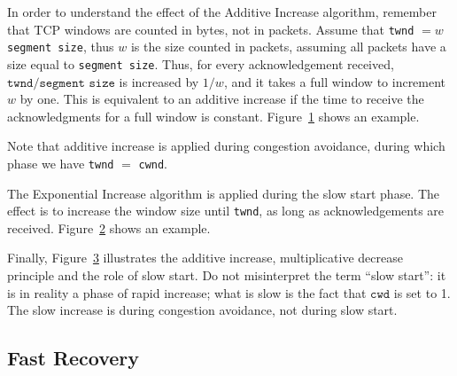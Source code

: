 %
In order to understand the effect of the Additive Increase algorithm,
remember that TCP windows are counted in bytes, not in packets.
Assume that \texttt{twnd} $= w$ \texttt{segment size}, thus $w$ is the
size counted in packets, assuming all packets have a size equal to
\texttt{segment size}. Thus, for every
acknowledgement received, $\texttt{twnd} / \texttt{segment size}$
is increased by $1/w$, and it takes a full window to increment $w$ by
one. This is equivalent to an additive increase if the time to
receive the acknowledgments for a full window is constant.
Figure~\ref{d32f3} shows an example.

Note that additive increase is applied during congestion avoidance,
during which phase we have \texttt{twnd} $=$ \texttt{cwnd}.
\begin{figure}[h]
        \protect\label{d32f3}
\end{figure}


The Exponential Increase algorithm is applied during the slow start
phase.  The effect is to increase the window size until \texttt{twnd},
as long as acknowledgements are received.  Figure~\ref{d32f4} shows an
example.

\begin{figure}[h]
        \protect\label{d32f4}
\end{figure}

Finally, Figure~\ref{d32f7} illustrates the additive increase,
multiplicative decrease principle and the role of slow start. Do not
misinterpret the term ``slow start'': it is in reality a phase of
rapid increase; what is slow is the fact that $\texttt{cwd}$ is set
to 1.  The slow increase is during congestion avoidance, not during
slow start.

\begin{figure}[h]
        \protect\label{d32f7}
\end{figure}

\subsection{Fast Recovery}

